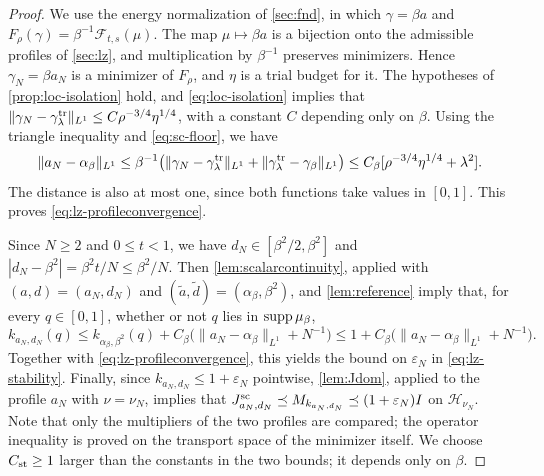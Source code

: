 \begin{proof}
We use the energy normalization of \cref{sec:fnd}, in which
$\gamma=\beta a$ and $F_\rho(\gamma)=\beta^{-1}\mathcal F_{t,s}(\mu)$.
The map $\mu\mapsto\beta a$ is a bijection onto the admissible profiles
of \cref{sec:lz}, and multiplication by $\beta^{-1}$ preserves
minimizers. Hence $\gamma_N=\beta a_N$ is a minimizer of $F_\rho$, and
$\eta$ is a trial budget for it. The hypotheses of
\cref{prop:loc-isolation} hold, and \eqref{eq:loc-isolation} implies
that
$\|\gamma_N-\gamma^{\rm tr}_\lambda\|_{L^1}\le C\rho^{-3/4}\eta^{1/4}$,
with a constant $C$ depending only on $\beta$. Using the triangle
inequality and \eqref{eq:sc-floor}, we have
\[
 \|a_N-\alpha_\beta\|_{L^1}
 \le\beta^{-1}\bigl(\|\gamma_N-\gamma^{\rm tr}_\lambda\|_{L^1}
       +\|\gamma^{\rm tr}_\lambda-\gamma_\beta\|_{L^1}\bigr)
 \le C_\beta[\rho^{-3/4}\eta^{1/4}+\lambda^2].
\]
The distance is also at most one, since both functions take values in
$[0,1]$. This proves \eqref{eq:lz-profileconvergence}.

Since $N\ge2$ and $0\le t<1$, we have $d_N\in[\beta^2/2,\beta^2]$ and
$|d_N-\beta^2|=\beta^2t/N\le\beta^2/N$. Then
\cref{lem:scalarcontinuity}, applied with $(a,d)=(a_N,d_N)$ and
$(\widetilde a,\widetilde d)=(\alpha_\beta,\beta^2)$, and
\cref{lem:reference} imply that, for every $q\in[0,1]$, whether or not
$q$ lies in $\operatorname{supp}\mu_\beta$,
\[
 k_{a_N,d_N}(q)\le k_{\alpha_\beta,\beta^2}(q)
 +C_\beta\bigl(\|a_N-\alpha_\beta\|_{L^1}+N^{-1}\bigr)
 \le1+C_\beta\bigl(\|a_N-\alpha_\beta\|_{L^1}+N^{-1}\bigr).
\]
Together with \eqref{eq:lz-profileconvergence}, this yields the bound
on $\varepsilon_N$ in \eqref{eq:lz-stability}. Finally, since
$k_{a_N,d_N}\le1+\varepsilon_N$ pointwise, \cref{lem:Jdom}, applied to
the profile $a_N$ with $\nu=\nu_N$, implies that
$J^{\mathrm{sc}}_{a_N,d_N}\preceq M_{k_{a_N,d_N}}\preceq(1+\varepsilon_N)I$ on
$\mathcal H_{\nu_N}$. Note that only the multipliers of the two
profiles are compared; the operator inequality is proved on the
transport space of the minimizer itself. We choose $C_{\rm st}\ge1$
larger than the constants in the two bounds; it depends only on
$\beta$.
\end{proof}
